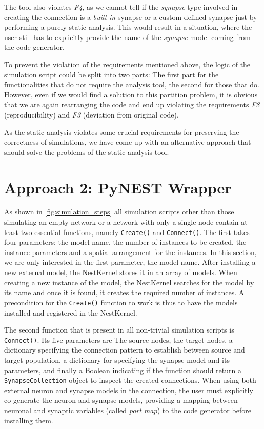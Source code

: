 The tool also violates \emph{F4}, as we cannot tell if the \emph{synapse} type involved in creating the connection is a \emph{built-in} synapse or a custom defined synapse just by performing a purely static analysis. This would result in a situation, where the user still has to explicitly provide the name of the \emph{synapse} model coming from the code generator.

To prevent the violation of the requirements mentioned above, the logic of the simulation script could be split into two parts: The first part for the functionalities that do not require the analysis tool, the second for those that do. However, even if we would find a solution to this partition problem, it is obvious that we are again rearranging the code and end up violating the requirements \emph{F8} (reproducibility) and \emph{F3} (deviation from original code).

As the static analysis violates some crucial requirements for preserving the correctness of simulations, we have come up with an alternative approach that should solve the problems of the static analysis tool.


\section{Approach 2: PyNEST Wrapper}

As shown in \autoref{fig:simulation_steps} all simulation scripts other than those simulating an empty network or a network with only a single node contain at least two essential functions, namely \texttt{Create()} and \texttt{Connect()}. The first takes four parameters: the model name, the number of instances to be created, the instance parameters and a spatial arrangement for the instances. In this section, we are only interested in the first parameter, the model name. After installing a new external model, the NestKernel stores it in an array of models. When creating a new instance of the model, the NestKernel searches for the model by its name and once it is found, it creates the required number of instances. A precondition for the \texttt{Create()} function to work is thus to have the models installed and registered in the NestKernel.

The second function that is present in all non-trivial simulation scripts is \texttt{Connect()}. Its five parameters are The source nodes, the target nodes, a dictionary specifying the connection pattern to establish between source and target population, a dictionary for specifying the synapse model and its parameters, and finally a Boolean indicating if the function should return a \texttt{SynapseCollection} object to inspect the created connections. When using both external neuron and synapse models in the connection, the user must explicitly co-generate the neuron and synapse models, providing a mapping between neuronal and synaptic variables (called \emph{port map}) to the code generator before installing them.

